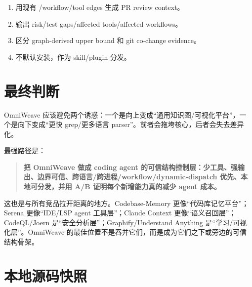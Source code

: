 \documentclass[11pt,a4paper]{article}
\newcommand{\code}[1]{\texttt{\detokenize{#1}}}
\begin{document}
\begin{enumerate}
  \item 用现有 \code{impact}/workflow/tool edges 生成 PR review context。
  \item 输出 risk/test gaps/affected tools/affected workflows。
  \item 区分 graph-derived upper bound 和 git co-change evidence。
  \item 不默认安装，作为 skill/plugin 分发。
\end{enumerate}

\section{最终判断}

OmniWeave 应该避免两个诱惑：一个是向上变成“通用知识图/可视化平台”，一个是向下变成“更快 grep/更多语言 parser”。前者会拖垮核心，后者会失去差异化。

最强路径是：

\begin{quote}
  \textbf{把 OmniWeave 做成 coding agent 的可信结构控制层：少工具、强输出、边界可信、跨语言/跨进程/workflow/dynamic-dispatch 优先、本地可分发，并用 A/B 证明每个新增能力真的减少 agent 成本。}
\end{quote}

这也是与所有竞品拉开距离的地方。Codebase-Memory 更像“代码库记忆平台”；Serena 更像“IDE/LSP agent 工具层”；Claude Context 更像“语义召回层”；CodeQL/Joern 是“安全分析层”；Graphify/Understand Anything 是“学习/可视化层”。OmniWeave 的最佳位置不是吞并它们，而是成为它们之下或旁边的可信结构骨架。

\appendix

\section{本地源码快照}
\end{document}
